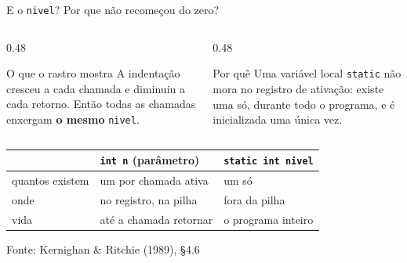 \documentclass[aspectratio=169]{beamer}
\newcommand{\fonte}[1]{\vfill\hfill{\scriptsize\textcolor{UFSGray}{Fonte: #1}}}
\begin{document}
\begin{frame}{E o \texttt{nivel}? Por que não recomeçou do zero?}
  \begin{columns}[T]
    \begin{column}{0.48\textwidth}
      \begin{block}{O que o rastro mostra}
        \small A indentação cresceu a cada chamada e diminuiu a cada
        retorno. Então todas as chamadas enxergam \textbf{o mesmo}
        \texttt{nivel}.
      \end{block}
    \end{column}
    \begin{column}{0.48\textwidth}
      \begin{block}{Por quê}
        \small Uma variável local \texttt{static} não mora no registro de
        ativação: existe uma só, durante todo o programa, e é inicializada
        uma única vez.
      \end{block}
    \end{column}
  \end{columns}
  \medskip
  \begin{center}
    \small
    \begin{tabular}{@{}lll@{}}
      \toprule
      & \texttt{int n} (parâmetro) & \texttt{static int nivel}\\
      \midrule
      quantos existem & um por chamada ativa & um só\\
      onde & no registro, na pilha & fora da pilha\\
      vida & até a chamada retornar & o programa inteiro\\
      \bottomrule
    \end{tabular}
  \end{center}
  \fonte{Kernighan \& Ritchie (1989), §4.6~\cite{kernighan1989c}}
\end{frame}
\end{document}
